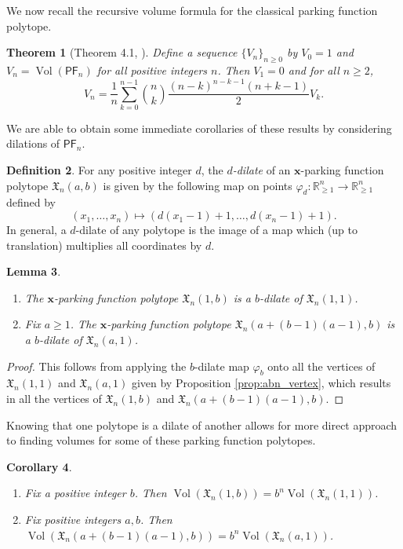\documentclass[11pt]{amsart}
\newtheorem{theorem}{Theorem}[section]
\newtheorem{lemma}[theorem]{Lemma}
\newtheorem{corollary}[theorem]{Corollary}
\theoremstyle{definition}
\newtheorem{definition}[theorem]{Definition}
\newcommand{\0}{\emptyset}
\newcommand{\R}{\mathbb{R}}
\newcommand{\bx}{\mathbf{x}}
\newcommand{\X}{\mathfrak{X}}
\newcommand{\Xn}{\mathfrak{X}_{n}(a,b)}
\newcommand{\PF}{\mathsf{PF}}
\DeclareMathOperator{\Vol}{Vol}
\begin{document}
We now recall the recursive volume formula for the classical parking function polytope.

\begin{theorem}[Theorem 4.1, \cite{AW}]\label{thm:mit_volume}
Define a sequence $\{V_n\}_{n \geq 0}$ by $V_0=1$ and $V_n = \Vol(\PF_n)$ for all positive integers $n$.
Then $V_1 = 0$ and for all $n \geq 2$,
\begin{equation*}
    V_n = \frac{1}{n} \sum_{k=0}^{n-1} \binom{n}{k} \frac{(n-k)^{n-k-1}(n+k-1)}{2} V_k.
\end{equation*}
\end{theorem}


We are able to obtain some immediate corollaries of these results by considering dilations of $\PF_n$.



\begin{definition}
For any positive integer $d$, the \textit{$d$-dilate} of an $\mathbf{x}$-parking function polytope $\Xn$ is given by the following map on points $\varphi_d: \R^n_{\geq 1} \to \R^n_{\geq 1}$ defined by
\[ (x_1, \ldots, x_n) \mapsto (d(x_1-1) + 1, \ldots, d(x_n-1) + 1).\]
In general, a $d$-dilate of any polytope is the image of a map which (up to translation) multiplies all coordinates by $d$.
\end{definition}

\begin{lemma}\label{lem:1,b,n-dilate+a,1,n-dilate}\
\begin{enumerate}
    \item The $\bx$-parking function polytope $\X_{n}(1,b)$ is a $b$-dilate of $\X_{n}(1,1)$. 
    \item Fix $ a \geq 1$. The 
    $\bx$-parking function polytope $\X_{n}(a + (b-1)(a-1) ,b)$ is a $b$-dilate of $\X_{n}(a,1)$.
\end{enumerate}
\end{lemma}
\begin{proof}
This follows from applying the $b$-dilate map $\varphi_b$ onto all the vertices of $\X_{n}(1,1)$ and $\X_{n}(a,1)$ given by Proposition \ref{prop:abn_vertex}, which results in all the vertices of $\X_{n}(1,b)$ and $\X_{n}(a + (b-1)(a-1) ,b)$.
\end{proof}


Knowing that one polytope is a dilate of another allows for more direct approach to finding volumes for some of these parking function polytopes.

\begin{corollary}\label{cor:b^n+a,1,n-vol}\
\begin{enumerate}
    \item Fix a positive integer $b$. Then $\Vol(\X_{n}(1,b)) = b^n\Vol(\X_{n}(1,1))$.
    \item Fix positive integers $a,b$. Then $\Vol(\X_{n}(a+ (b-1)(a-1),b)) = b^n\Vol(\X_{n}(a,1))$.
\end{enumerate}
\end{corollary}
\end{document}
